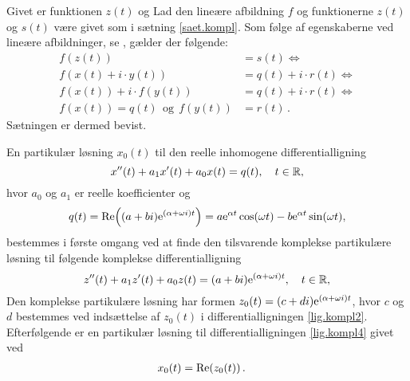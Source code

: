 \begin{bevis}
Givet er funktionen $ z(t) $ og Lad den lineære afbildning $ f $ og funktionerne $ z(t) $ og $ s(t) $ være givet som i sætning \ref{saet.kompl}. Som følge af egenskaberne ved lineære afbildninger, se , gælder der følgende:
\begin{equation}
\begin{aligned}
f(z(t)) &= s(t) \Leftrightarrow \\
f(x(t) + i \cdot y(t)) &= q(t) + i \cdot r(t) \Leftrightarrow \\
f(x(t)) + i\cdot f(y(t)) &= q(t) + i \cdot r(t) \Leftrightarrow \\
f(x(t)) = q(t) \;\, \mathrm{og} \,\; f(y(t)) &= r(t) \,.
\end{aligned}
\end{equation}
Sætningen er dermed bevist.
\end{bevis}




\begin{method} \label{met.kompl}
En partikulær løsning $ x_0(t) $ til den reelle inhomogene differentialligning
\begin{equation}
x''(t) + a_1x'(t) + a_0x(t) = q(t), \quad t \in \mathbb{R}, \label{lig.kompl4}
\end{equation}
hvor $ a_0 $ og $ a_1 $ er reelle koefficienter og
\begin{equation}
q(t) = \mathrm{Re} \! \left((a+bi) \mathrm{e}^{(\alpha + \omega i)t}\right) = a \mathrm{e}^{\alpha t}\cos(\omega t) - b \mathrm{e}^{\alpha t} \sin(\omega t),
\end{equation}
bestemmes i første omgang ved at finde den tilsvarende komplekse partikulære løsning til følgende komplekse differentialligning
\begin{equation} \label{lig.kompl2}
z''(t) + a_1z'(t) + a_0z(t) = (a+bi) \mathrm{e}^{(\alpha + \omega i)t}, \quad t \in \mathbb{R},
\end{equation}
Den komplekse partikulære løsning har formen $ z_{0}(t) = (c+di) \mathrm{e}^{(\alpha + \omega i)t} $, hvor $ c $ og $ d $ bestemmes ved indsættelse af $ z_{0}(t) $ i differentialligningen \eqref{lig.kompl2}. \bs
Efterfølgende er en partikulær løsning til differentialligningen \eqref{lig.kompl4} givet ved
\begin{equation}
\begin{aligned}
x_0(t) &= \mathrm{Re} \! \left(z_{0}(t)\right).
\end{aligned}
\end{equation}
\end{method}

